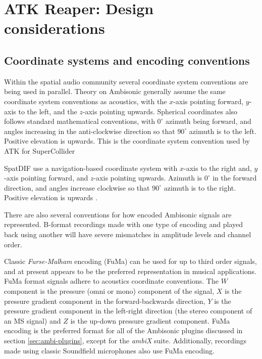 \documentclass{article}
\begin{document}
\section{ATK Reaper: Design considerations}\label{sec:design}

\subsection{Coordinate systems and encoding conventions}\label{sec:coordinate-systems}

Within the spatial audio community several coordinate system conventions are being used in parallel.
Theory on Ambisonic generally assume the same coordinate system conventions as acoustics, with the $x$-axis pointing forward, $y$-axis to the left, and the $z$-axis pointing upwards. 
Spherical coordinates also follows standard mathematical conventions, with $0^{\circ}$ azimuth being forward, and angles increasing in the anti-clockwise direction so that $90^{\circ}$ azimuth is to the left.
Positive elevation is upwards.
This is the coordinate system convention used by ATK for SuperCollider

SpatDIF use a navigation-based coordinate system with $x$-axis to the right and, $y$-axis pointing forward, and $z$-axis pointing upwards.
Azimuth is $0^{\circ}$ in the forward direction, and angles increase clockwise so that $90^{\circ}$ azimuth is to the right.
Positive elevation is upwards \cite{Peters:2013spatdif}.

There are also several conventions for how encoded Ambisonic signals are represented.
B-format recordings made with one type of encoding and played back using another will have severe mismatches in amplitude levels and channel order.

Classic \emph{Furse-Malham} encoding (FuMa) can be used for up to third order signals, and at present appears to be the preferred representation in musical applications.
FuMa format signals adhere to acoustics coordinate conventions.
The $W$ component is the pressure (omni or mono) component of the signal, $X$ is the pressure gradient component in the forward-backwards direction, $Y$ is the pressure gradient component in the left-right direction (the stereo component of an MS signal) and $Z$ is the up-down pressure gradient component.
FuMa encoding is the preferred format for all of the Ambisonic plugins discussed in section \ref{sec:ambi-plugins}, except for the \emph{ambiX} suite. Additionally, recordings made using classic Soundfield microphones also use FuMa encoding.
\end{document}
